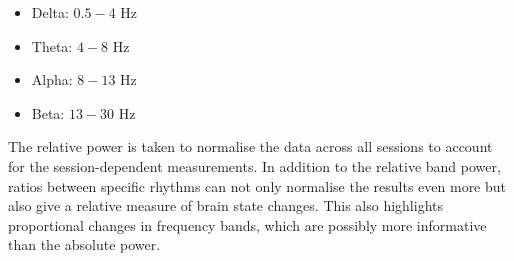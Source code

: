     \begin{itemize}
      \item Delta: $0.5 - 4$ Hz
      \item Theta: $4 - 8$ Hz
      \item Alpha: $8 - 13$ Hz
      \item Beta: $13 - 30$ Hz
    \end{itemize}
    The relative power is taken to normalise the data across all sessions to account for the session-dependent measurements. In addition to the relative band power, ratios between specific rhythms can not only normalise the results even more but also give a relative measure of brain state changes. This also highlights proportional changes in frequency bands, which are possibly more informative than the absolute power. \par

